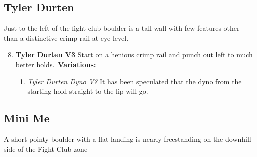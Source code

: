 \subsection*{Tyler Durten}\label{bf:Tyler Durten}
Just to the left of the fight club boulder is a tall wall with few features other than a distinctive crimp rail at eye level.

\begin{enumerate}[]
	\setcounter{enumi}{7}
	\item\label{rt:Tyler Durten} \colorbox{green!20}{\textbf{Tyler Durten V3   } }
	\newline Start on a henious crimp rail and punch out left to much better holds.\
	\newline \textbf{Variations:}
	\begin{enumerate}
		\item\label{vr:Tyler Durten Dyno} \colorbox{black!20}{\emph{Tyler Durten Dyno V?  }  }
		\newline It has been speculated that the dyno from the starting hold straight to the lip will go.\
	\end{enumerate}
\end{enumerate}
\subsection*{Mini Me}\label{bf:Mini Me}
A short pointy boulder with a flat landing is nearly freestanding on the downhill side of the Fight Club zone

